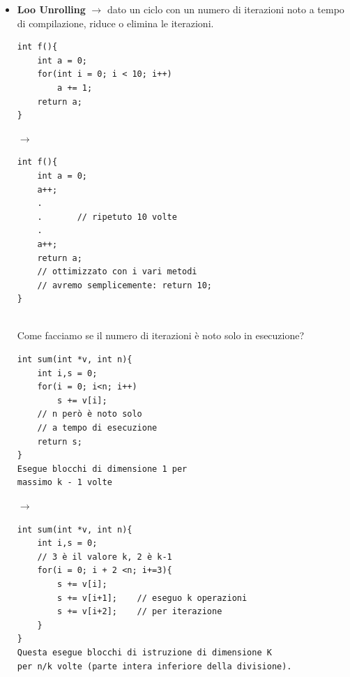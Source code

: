 \begin{itemize}
\begin{verbatim}
int g(int k){
    printf("Pippo");
    return k+1;
}
int f(int x, int n){
    int s = 1;
    for( ; n > 0; n--)
        s += g(x);  // espressioni come questa o l'uso di variabili globali poichè potrebbero
    return s;       //  essere modificate durante il programma a nostra insaputa
}
\end{verbatim}
    \item \textbf{Loo Unrolling} $\rightarrow$ dato un ciclo con un numero di iterazioni noto
    a tempo di compilazione, riduce o elimina le iterazioni.\medskip\\
    \begin{minipage}{0.3\textwidth}
    \begin{verbatim}
int f(){
    int a = 0;
    for(int i = 0; i < 10; i++)
        a += 1;
    return a;
}
    \end{verbatim}
    \end{minipage}
    \hfill
    $\longrightarrow$
    \hfill
    \begin{minipage}{0.4\textwidth}
        \begin{verbatim}
int f(){
    int a = 0;
    a++;
    .
    .       // ripetuto 10 volte
    .
    a++;
    return a; 
    // ottimizzato con i vari metodi 
    // avremo semplicemente: return 10;
}
        \end{verbatim}
    \end{minipage}\medskip\\
\noindent Come facciamo se il numero di iterazioni è noto solo in esecuzione?\medskip\\
\begin{minipage}{0.4\textwidth}
    \begin{verbatim}
int sum(int *v, int n){
    int i,s = 0;
    for(i = 0; i<n; i++) 
        s += v[i];
    // n però è noto solo
    // a tempo di esecuzione
    return s;
}
Esegue blocchi di dimensione 1 per 
massimo k - 1 volte 
    \end{verbatim}
\end{minipage}
\hfill
$\longrightarrow$
\hfill
\begin{minipage}{0.5\textwidth}
    \begin{verbatim}
int sum(int *v, int n){
    int i,s = 0;
    // 3 è il valore k, 2 è k-1
    for(i = 0; i + 2 <n; i+=3){ 
        s += v[i];
        s += v[i+1];    // eseguo k operazioni 
        s += v[i+2];    // per iterazione
    } 
}
Questa esegue blocchi di istruzione di dimensione K
per n/k volte (parte intera inferiore della divisione).

\end{verbatim}
\end{minipage}
\end{itemize}
